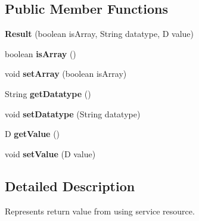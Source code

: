 \subsection*{Public Member Functions}
\begin{DoxyCompactItemize}
\item 
\mbox{\label{classeu_1_1h2020_1_1symbiote_1_1cloud_1_1model_1_1data_1_1Result_a84c5c8cb67c7e2bef6f976661131e93a}} 
{\bfseries Result} (boolean is\+Array, String datatype, D value)
\item 
\mbox{\label{classeu_1_1h2020_1_1symbiote_1_1cloud_1_1model_1_1data_1_1Result_a7207cde6cd839068f50aacd8f6308ba6}} 
boolean {\bfseries is\+Array} ()
\item 
\mbox{\label{classeu_1_1h2020_1_1symbiote_1_1cloud_1_1model_1_1data_1_1Result_ac847159f4a86f55301676c61a445f7bf}} 
void {\bfseries set\+Array} (boolean is\+Array)
\item 
\mbox{\label{classeu_1_1h2020_1_1symbiote_1_1cloud_1_1model_1_1data_1_1Result_add65b957587cd86a10385066106a6835}} 
String {\bfseries get\+Datatype} ()
\item 
\mbox{\label{classeu_1_1h2020_1_1symbiote_1_1cloud_1_1model_1_1data_1_1Result_ac9b064b0e41f64e851b7ee48c79fba5c}} 
void {\bfseries set\+Datatype} (String datatype)
\item 
\mbox{\label{classeu_1_1h2020_1_1symbiote_1_1cloud_1_1model_1_1data_1_1Result_ae55b35f3e4ef4bc0873cfa0f96cc0a67}} 
D {\bfseries get\+Value} ()
\item 
\mbox{\label{classeu_1_1h2020_1_1symbiote_1_1cloud_1_1model_1_1data_1_1Result_a9ef7761cb11a170be5d55c26ed600416}} 
void {\bfseries set\+Value} (D value)
\end{DoxyCompactItemize}


\subsection{Detailed Description}
Represents return value from using service resource.

